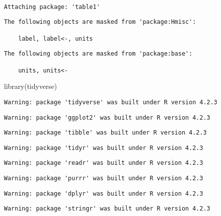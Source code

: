 \documentclass[
  letterpaper,
  DIV=11,
  numbers=noendperiod]{scrartcl}
\newenvironment{Shaded}{\begin{snugshade}}{\end{snugshade}}
\newcommand{\FunctionTok}[1]{\textcolor[rgb]{0.28,0.35,0.67}{#1}}
\newcommand{\NormalTok}[1]{\textcolor[rgb]{0.00,0.23,0.31}{#1}}
\begin{document}
\begin{verbatim}

Attaching package: 'table1'
\end{verbatim}

\begin{verbatim}
The following objects are masked from 'package:Hmisc':

    label, label<-, units
\end{verbatim}

\begin{verbatim}
The following objects are masked from 'package:base':

    units, units<-
\end{verbatim}

\begin{Shaded}
\begin{Highlighting}[]
\FunctionTok{library}\NormalTok{(tidyverse)}
\end{Highlighting}
\end{Shaded}

\begin{verbatim}
Warning: package 'tidyverse' was built under R version 4.2.3
\end{verbatim}

\begin{verbatim}
Warning: package 'ggplot2' was built under R version 4.2.3
\end{verbatim}

\begin{verbatim}
Warning: package 'tibble' was built under R version 4.2.3
\end{verbatim}

\begin{verbatim}
Warning: package 'tidyr' was built under R version 4.2.3
\end{verbatim}

\begin{verbatim}
Warning: package 'readr' was built under R version 4.2.3
\end{verbatim}

\begin{verbatim}
Warning: package 'purrr' was built under R version 4.2.3
\end{verbatim}

\begin{verbatim}
Warning: package 'dplyr' was built under R version 4.2.3
\end{verbatim}

\begin{verbatim}
Warning: package 'stringr' was built under R version 4.2.3
\end{verbatim}
\end{document}
